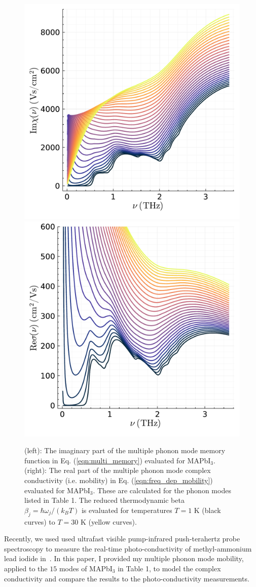\begin{figure}[t]
    \centering
    \includegraphics[width=.49\textwidth]{figures/zero_mem.pdf}
    \includegraphics[width=.49\textwidth]{figures/zero_conduct.pdf}
    
    \caption{(left): The imaginary part of the multiple phonon mode memory function in Eq. (\ref{eqn:multi_memory}) evaluated for MAPbI$_3$. (right): The real part of the multiple phonon mode complex conductivity (i.e. mobility) in Eq. (\ref{eqn:freq_dep_mobility}) evaluated for MAPbI$_3$. These are calculated for the phonon modes listed in Table 1. The reduced thermodynamic beta $\beta_j = \hbar \omega_j / (k_B T)$ is evaluated for temperatures $T = 1$ K (black curves) to $T = 30$ K (yellow curves).}
    \label{fig:athermal_thz}
\end{figure}

Recently, we used used ultrafast visible pump-infrared push-terahertz probe spectroscopy to measure the real-time photo-conductivity of methyl-ammonium lead iodide in~\cite{zheng_multipulse_2021}. In this paper, I provided my multiple phonon mode mobility, applied to the $15$ modes of MAPbI$_3$ in Table 1, to model the complex conductivity and compare the results to the photo-conductivity measurements. 

